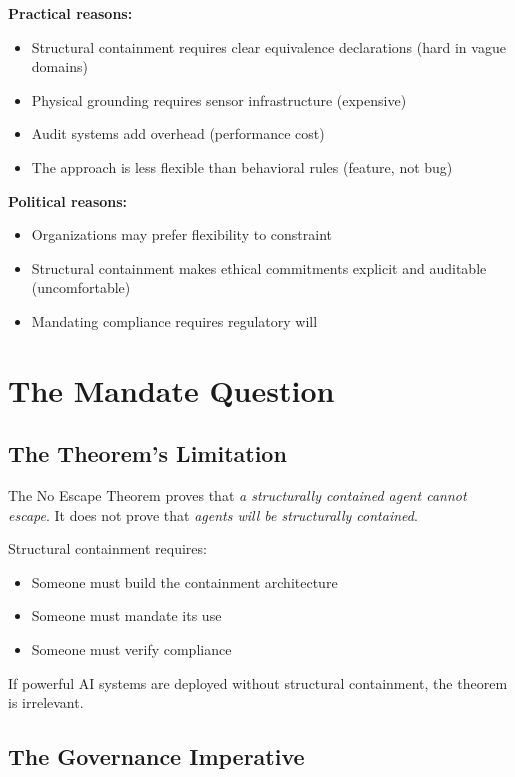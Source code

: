 \documentclass[12pt]{article}
\theoremstyle{definition}
\begin{document}
\textbf{Practical reasons:}
\begin{itemize}
    \item Structural containment requires clear equivalence declarations (hard in vague domains)
    \item Physical grounding requires sensor infrastructure (expensive)
    \item Audit systems add overhead (performance cost)
    \item The approach is less flexible than behavioral rules (feature, not bug)
\end{itemize}

\textbf{Political reasons:}
\begin{itemize}
    \item Organizations may prefer flexibility to constraint
    \item Structural containment makes ethical commitments explicit and auditable (uncomfortable)
    \item Mandating compliance requires regulatory will
\end{itemize}

\section{The Mandate Question}

\subsection{The Theorem's Limitation}

The No Escape Theorem proves that \emph{a structurally contained agent cannot escape}. It does not prove that \emph{agents will be structurally contained}.

Structural containment requires:
\begin{itemize}
    \item Someone must build the containment architecture
    \item Someone must mandate its use
    \item Someone must verify compliance
\end{itemize}

If powerful AI systems are deployed without structural containment, the theorem is irrelevant.

\subsection{The Governance Imperative}
\end{document}
